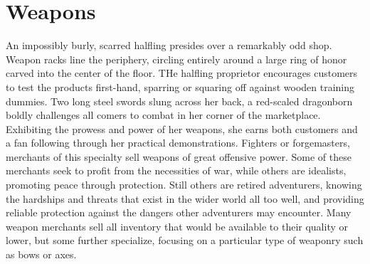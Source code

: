 \documentclass[10pt,a4paper,twoside,twocolumn,openany,nodeprecatedcode,bg=print]{dndbook}
\begin{document}
\section{Weapons}
An impossibly burly, scarred halfling presides over a remarkably odd shop. Weapon racks line the periphery, circling entirely around a large ring of honor carved into the center of the floor. THe halfling proprietor encourages customers to test the products first-hand, sparring or squaring off against wooden training dummies.
Two long steel swords slung across her back, a red-scaled dragonborn boldly challenges all comers to combat in her corner of the marketplace. Exhibiting the prowess and power of her weapons, she earns both customers and a fan following through her practical demonstrations.
Fighters or forgemasters, merchants of this specialty sell weapons of great offensive power. Some of these merchants seek to profit from the necessities of war, while others are idealists, promoting peace through protection. Still others are retired adventurers, knowing the hardships and threats that exist in the wider world all too well, and providing reliable protection against the dangers other adventurers may encounter. Many weapon merchants sell all inventory that would be available to their quality or lower, but some further specialize, focusing on a particular type of weaponry such as bows or axes.
\end{document}
